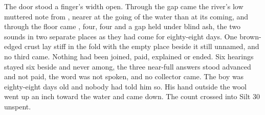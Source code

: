 The door stood a finger's width open. Through the gap came the river's low muttered note from , nearer at the going of the water than at its coming, and through the floor came , four, four and a gap held under blind ash, the two sounds in two separate places as they had come for eighty-eight days. One brown-edged crust lay stiff in the fold with the empty place beside it still unnamed, and no third came. Nothing had been joined, paid, explained or ended. Six hearings stayed six beside and never among, the three near-full answers stood advanced and not paid, the word was not spoken, and no collector came. The boy was eighty-eight days old and nobody had told him so. His hand outside the wool went up an inch toward the water and came down. The count crossed into Silt 30 unspent.
